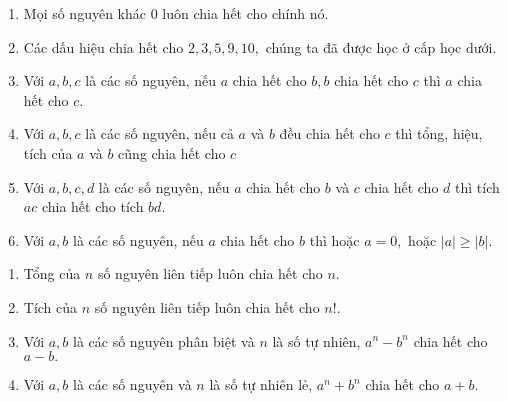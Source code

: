 \begin{light}
\begin{enumerate}
    \item Mọi số nguyên khác 0 luôn chia hết cho chính nó.
    \item Các dấu hiệu chia hết cho $2,3,5,9,10,$ chúng ta đã được học ở cấp học dưới. 
    \item Với $a,b,c$ là các số nguyên, nếu $a$ chia hết cho $b,b$ chia hết cho $c$ thì $a$ chia hết cho $c.$
    \item Với $a,b,c$ là các số nguyên, nếu cả $a$ và $b$ đều chia hết cho $c$ thì tổng, hiệu, tích của $a$ và $b$ cũng chia hết cho $c$ 
    \item  Với $a,b,c,d$ là các số nguyên, nếu $a$ chia hết cho $b$ và $c$ chia hết cho $d$ thì tích $ac$ chia hết cho tích $bd$. 
    \item Với $a,b$ là các số nguyên, nếu $a$ chia hết cho $b$ thì hoặc $a=0,$ hoặc $|a|\ge |b|.$
\end{enumerate}
\begin{enumerate}
    \item Tổng của $n$ số nguyên liên tiếp luôn chia hết cho $n.$
    \item Tích của $n$ số nguyên liên tiếp luôn chia hết cho $n!.$    
    \item Với $a,b$ là các số nguyên phân biệt và $n$ là số tự nhiên, $a^n-b^n$ chia hết cho $a-b.$
    \item Với $a,b$ là các số nguyên và $n$ là số tự nhiên lẻ, $a^n+b^n$ chia hết cho $a+b.$    
\end{enumerate}
\end{light}

